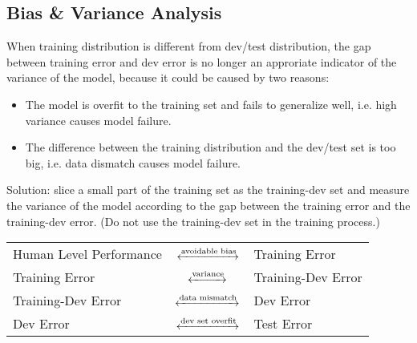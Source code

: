 \subsection{Bias \& Variance Analysis}
When training distribution is different from dev/test distribution, the gap between training error and dev error is no longer an approriate indicator of the variance of the model, because it could be caused by two reasons:
\begin{itemize}
  \item The model is overfit to the training set and fails to generalize well, i.e. high variance causes model failure.
  \item The difference between the training distribution and the dev/test set is too big, i.e. data dismatch causes model failure.
\end{itemize}
Solution: slice a small part of the training set as the training-dev set and measure the variance of the model according to the gap between the training error and the training-dev error. (Do not use the training-dev set in the training process.)

\begin{table}[ht]
  \centering
  \begin{tabular}{lcl}
  Human Level Performance & $\xleftrightarrow{\text{avoidable bias}}$ & Training Error \\
  Training Error & $\xleftrightarrow{\text{variance}}$ & Training-Dev Error \\
  Training-Dev Error & $\xleftrightarrow{\text{data mismatch}}$ & Dev Error \\
  Dev Error & $\xleftrightarrow{\text{dev set overfit}}$ & Test Error
  \end{tabular}
\end{table}
\ifx\PREAMBLE\undefined

\fi